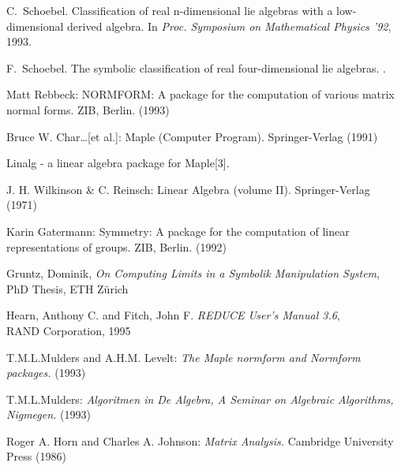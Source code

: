 \begin{thebibliography}{999}
C.~Schoebel.
\newblock Classification of real n-dimensional lie algebras with a
  low-dimensional derived algebra.
\newblock In {\em Proc. {Symposium on Mathematical Physics} '92}, 1993.

F.~Schoebel.
\newblock The symbolic classification of real four-dimensional lie algebras.
.


 Matt Rebbeck: NORMFORM: A {\REDUCE} package for the 
computation of various matrix normal forms. ZIB, Berlin. (1993)


 Bruce W. Char\ldots [et al.]: Maple (Computer 
        Program). Springer-Verlag (1991)

 Linalg - a linear algebra package for Maple[3].

 J. H. Wilkinson \& C. Reinsch: Linear Algebra 
(volume II). Springer-Verlag (1971)

 Karin Gatermann: Symmetry: A {\REDUCE} package for the 
computation of linear representations of groups. ZIB, Berlin. (1992)


 Gruntz, Dominik,
\textit{On Computing Limits in a Symbolik Manipulation System}, \\
PhD Thesis, ETH Z\"urich

 Hearn, Anthony C. and Fitch, John F.
\textit{REDUCE User's Manual 3.6}, \\ RAND Corporation, 1995


 T.M.L.Mulders and A.H.M. Levelt: {\it The Maple 
        normform and Normform packages.} (1993)

 T.M.L.Mulders: {\it Algoritmen in De Algebra, A 
        Seminar on Algebraic Algorithms, Nigmegen.} (1993)

 Roger A. Horn and Charles A. Johnson: {\it Matrix 
        Analysis.} Cambridge University Press (1986)




\end{thebibliography}
